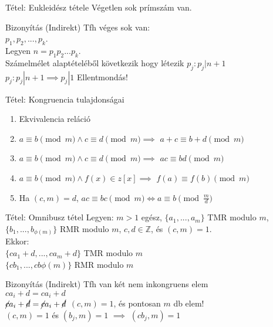 \documentclass{beamer}
\begin{document}
\begin{frame}

\begin{block}{Tétel: Eukleidész tétele}
Végetlen sok prímszám van.
\end{block}

\begin{block}{Bizonyítás (Indirekt)}
Tfh véges sok van:\\
$p_1, p_2, ... ,p_k$.\\
Legyen $n = p_1p_2...p_k$.\\
Számelmélet alaptételéből következik hogy létezik $p_j : p_j | n + 1$\\
$p_j : p_j | n + 1 \implies p_j | 1$ Ellentmondás!
\end{block}

\end{frame}

\begin{frame}

\begin{block}{Tétel: Kongruencia tulajdonságai}
\begin{enumerate}
\item Ekvivalencia reláció
\item $a \equiv b \pmod{m} \land c \equiv d \pmod{m} \implies$ \textbf{$a + c \equiv b + d \pmod{m}$}
\item $a \equiv b \pmod{m} \land c \equiv d \pmod{m} \implies$ \textbf{$ac \equiv bd \pmod{m}$}
\item $a \equiv b \pmod{m} \land f(x) \in z[x] \implies$ \textbf{$f(a) \equiv f(b) \pmod{m}$}
\item Ha $(c, m) = d$, $ac \equiv bc \pmod{m} \iff a \equiv b \pmod{\frac{m}{d}}$
\end{enumerate}
\end{block}

\end{frame}

\begin{frame}

\begin{block}{Tétel: Omnibusz tétel}
Legyen: $m > 1$ egész, $\{a_1, ..., a_m\}$ TMR modulo $m$, $\{b_1, ..., b_{{\phi}(m)}\}$ RMR modulo $m$, $c, d \in \mathbb{Z}$, és $(c,m) = 1$.\\
\smallskip
Ekkor:\\
\smallskip
$\{ ca_1 + d, ..., ca_m + d \}$ TMR modulo $m$\\
$\{ cb_1, ..., cb{{\phi}(m)}\}$ RMR modulo $m$
\end{block}

\begin{block}{Bizonyítás (Indirekt)}
Tfh van két nem inkongruens elem\\
$ca_i + d = ca_i + d$\\
${\cancel{c}}a_i + {\cancel{d}} = {\cancel{c}}a_i + {\cancel{d}}$ $(c, m) = 1$, és pontosan $m$ db elem!\\
$(c, m) = 1$ és $(b_j,m) = 1$ $\implies$ $(cb_j, m) = 1$

\end{block}

\end{frame}
\end{document}
